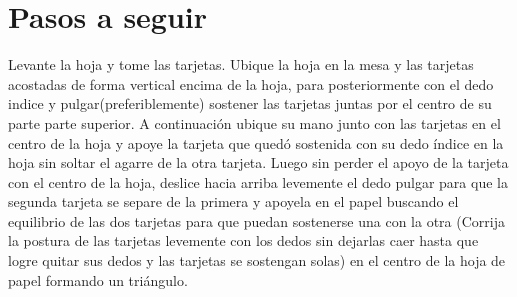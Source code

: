 \documentclass{article}
\begin{document}
\section{Pasos a seguir}\label{pasos}
Levante la hoja y tome las tarjetas. Ubique la hoja en la mesa y las tarjetas acostadas de forma vertical encima de la hoja, para posteriormente con el dedo indice y pulgar(preferiblemente) sostener las tarjetas juntas por el centro de su parte parte superior. A continuación ubique su mano junto con las tarjetas en el centro de la hoja y apoye la tarjeta que quedó sostenida con su dedo índice en la hoja sin soltar el agarre de la otra tarjeta. Luego sin perder el apoyo de la tarjeta con el centro de la hoja, deslice hacia arriba levemente el dedo pulgar para que la segunda tarjeta se separe de la primera y apoyela en el papel buscando el equilibrio de las dos tarjetas para que puedan sostenerse una con la otra (Corrija la postura de las tarjetas levemente con los dedos sin dejarlas caer hasta que logre quitar sus dedos y las tarjetas se sostengan solas) en el centro de la hoja de papel formando un triángulo.
\end{document}
